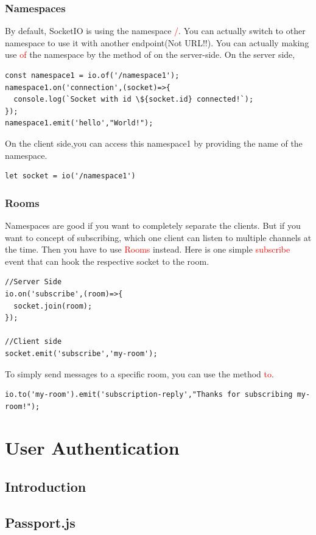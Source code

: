 \documentclass[a4paper]{article}
\begin{document}
\subsubsection{Namespaces}
By default, SocketIO is using the namespace \textcolor{red}{/}. You can actually switch to other namespace to use it with another endpoint(Not URL!!). You can actually making use \textcolor{red}{of} the namespace by the method of on the server-side. On the server side,
\begin{lstlisting}
const namespace1 = io.of('/namespace1');  
namespace1.on('connection',(socket)=>{
  console.log(`Socket with id \${socket.id} connected!`);
});
namespace1.emit('hello',"World!");
\end{lstlisting}
On the client side,you can access this namespace1 by providing the name of the namespace.
\begin{lstlisting}
let socket = io('/namespace1')
\end{lstlisting}
\subsubsection{Rooms}
Namespaces are good if you want to completely separate the clients. But if you want to concept of subscribing, which one client can listen to multiple channels at the time. Then you have to use \textcolor{red}{Rooms} instead. Here is one simple \textcolor{red}{subscribe} event that can hook the respective socket to the room.
\begin{lstlisting}
//Server Side
io.on('subscribe',(room)=>{
  socket.join(room);
});

//Client side
socket.emit('subscribe','my-room');
\end{lstlisting}
To simply send messages to a specific room, you can use the method \textcolor{red}{to}.

\begin{lstlisting}
io.to('my-room').emit('subscription-reply',"Thanks for subscribing my-room!");
\end{lstlisting}


\section{User Authentication}
\subsection{Introduction}
\subsection{Passport.js}
\end{document}

